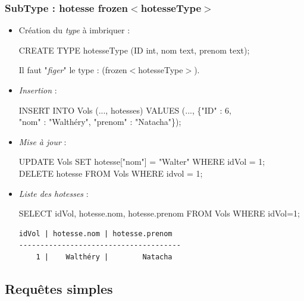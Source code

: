 \begin{frame}[fragile]
	\frametitle{SubType : hotesse frozen$<$hotesseType$>$}
	\begin{itemize}
		\item Création du \textit{type} à imbriquer :\color{fondCnamGris3}
		
		\footnotesize
		CREATE TYPE hotesseType (ID int, nom text, prenom text);
		\normalsize\color{black}
		
		Il faut "\textit{figer}" le type : (frozen$<$hotesseType$>$).

		\item \textit{Insertion} :\color{fondCnamGris3}		
		
		\footnotesize
		INSERT INTO Vols (..., hotesses) VALUES (..., \{"ID" : 6,\\
		\hspace*{3cm}"nom" : "Walthéry", "prenom" : "Natacha"\});
		\normalsize\color{black}
		
		\item \textit{Mise à jour} :\color{fondCnamGris3}
		
		\footnotesize
		UPDATE Vols SET hotesse["nom"] = "Walter" WHERE idVol = 1;\\
		DELETE hotesse FROM Vols WHERE idvol = 1; 
		\normalsize\color{black}
		
		\item \textit{Liste des hotesses} :\color{fondCnamGris3}
		
		\footnotesize
		SELECT idVol, hotesse.nom, hotesse.prenom FROM Vols WHERE idVol=1; 
		\normalsize\color{fondCnamGris2}
		\scriptsize
		\begin{verbatim}
idVol | hotesse.nom | hotesse.prenom
--------------------------------------
    1 |    Walthéry |        Natacha
		\end{verbatim}
	\end{itemize}
\end{frame}


\subsection[Queries]{Requêtes simples}


